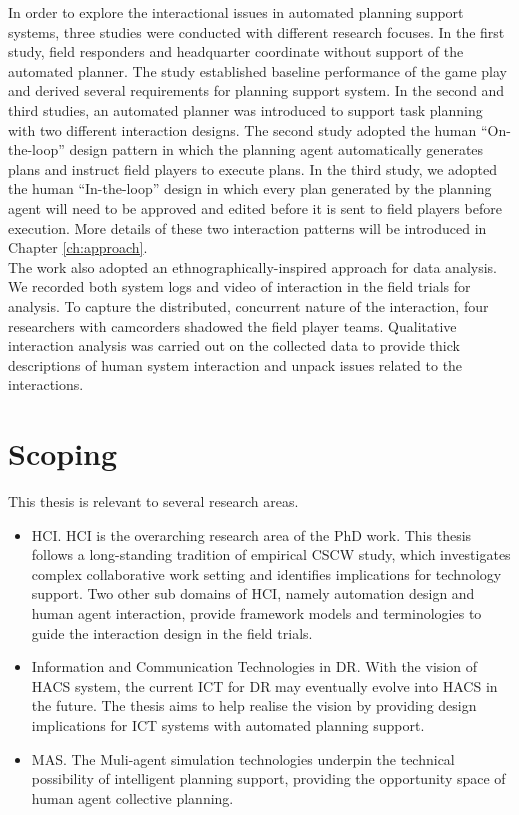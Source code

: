 In order to explore the interactional issues in automated planning support systems, three studies were conducted with different research focuses. In the first study, field responders and headquarter coordinate without support of the automated planner. The study established baseline performance of the game play and derived several requirements for planning support system. In the second and third studies, an automated planner was introduced to support task planning with two different interaction designs. The second study adopted the human ``On-the-loop'' design pattern in which the planning agent automatically generates plans and instruct field players to execute plans. In the third study, we adopted the human ``In-the-loop'' design in which every plan generated by the planning agent will need to be approved and edited before it is sent to field players before execution. More details of these two interaction patterns will be introduced in Chapter \ref{ch:approach}.\\

The work also adopted an ethnographically-inspired approach for data analysis. We recorded both system logs and video of interaction in the field trials for analysis. To capture the distributed, concurrent nature of the interaction, four researchers with camcorders shadowed the field player teams. Qualitative interaction analysis was carried out on the collected data to provide thick descriptions of human system interaction and unpack issues related to the interactions.\\


\section{Scoping}\label{sec:custom}
This thesis is relevant to several research areas. \\

\begin{itemize} 
  \item \acf{HCI}. \ac{HCI} is the overarching research area of the PhD work. This thesis follows a long-standing tradition of empirical \ac{CSCW} study, which investigates complex  collaborative work setting and identifies implications for technology support. Two other sub domains of \ac{HCI}, namely automation design and human agent interaction, provide framework models and terminologies to guide the interaction design in the field trials.
  \item Information and Communication Technologies in \ac{DR}. With the vision of \ac{HACS} system, the current \ac{ICT} for \ac{DR} may eventually evolve into \ac{HACS} in the future. The thesis aims to help realise the vision by providing design implications for \ac{ICT} systems with automated planning support. 
  \item \acf{MAS}. The Muli-agent simulation technologies underpin the technical possibility of intelligent planning support, providing the opportunity space of human agent collective planning. 
\end{itemize}

